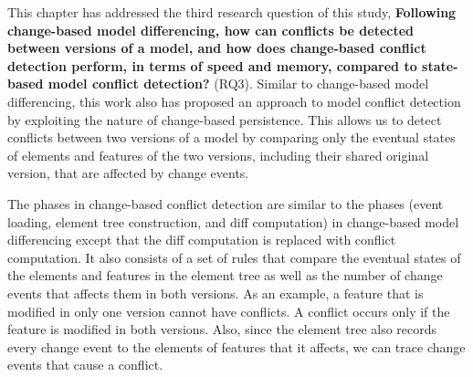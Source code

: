 This chapter has addressed the third research question of this study, \textbf{Following change-based model differencing, how can conflicts be detected between versions of a model, and how does change-based conflict detection perform, in terms of speed and memory, compared to state-based model conflict detection?} (RQ3). Similar to change-based model differencing, this work also has proposed an approach to model conflict detection by exploiting the nature of change-based persistence. This allows us to detect conflicts between two versions of a model by comparing only the eventual states of elements and features of the two versions, including their shared original version, that are affected by change events.

The phases in change-based conflict detection are similar to the phases (event loading, element tree construction, and diff computation) in change-based model differencing except that the diff computation is replaced with conflict computation. It also consists of a set of rules that compare the eventual states of the elements and features in the element tree as well as the number of change events that affects them in both versions. As an example, a feature that is modified in only one version cannot have conflicts. A conflict occurs only if the feature is modified in both versions. Also, since the element tree also records every change event to the elements of features that it affects, we can trace change events that cause a conflict.
